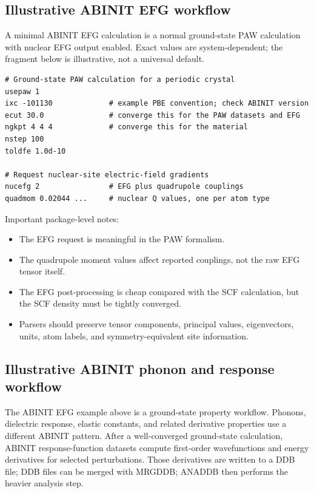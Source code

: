 \documentclass[11pt]{article}
\begin{document}
\subsection{Illustrative ABINIT EFG workflow}

A minimal ABINIT EFG calculation is a normal ground-state PAW calculation with nuclear EFG output enabled.  Exact values are system-dependent; the fragment below is illustrative, not a universal default.

\begin{lstlisting}[language={},caption={Illustrative ABINIT EFG input fragment.}]
# Ground-state PAW calculation for a periodic crystal
usepaw 1
ixc -101130             # example PBE convention; check ABINIT version
ecut 30.0               # converge this for the PAW datasets and EFG
ngkpt 4 4 4             # converge this for the material
nstep 100
toldfe 1.0d-10

# Request nuclear-site electric-field gradients
nucefg 2                # EFG plus quadrupole couplings
quadmom 0.02044 ...     # nuclear Q values, one per atom type
\end{lstlisting}

Important package-level notes:
\begin{itemize}
\item The EFG request is meaningful in the PAW formalism.
\item The quadrupole moment values affect reported couplings, not the raw EFG tensor itself.
\item The EFG post-processing is cheap compared with the SCF calculation, but the SCF density must be tightly converged.
\item Parsers should preserve tensor components, principal values, eigenvectors, units, atom labels, and symmetry-equivalent site information.
\end{itemize}

\subsection{Illustrative ABINIT phonon and response workflow}

The ABINIT EFG example above is a ground-state property workflow.  Phonons, dielectric response, elastic constants, and related derivative properties use a different ABINIT pattern.  After a well-converged ground-state calculation, ABINIT response-function datasets compute first-order wavefunctions and energy derivatives for selected perturbations.  Those derivatives are written to a DDB file; DDB files can be merged with MRGDDB; ANADDB then performs the heavier analysis step.\cite{ABINIT_RESPFN,ABINIT_ANADDB}
\end{document}

